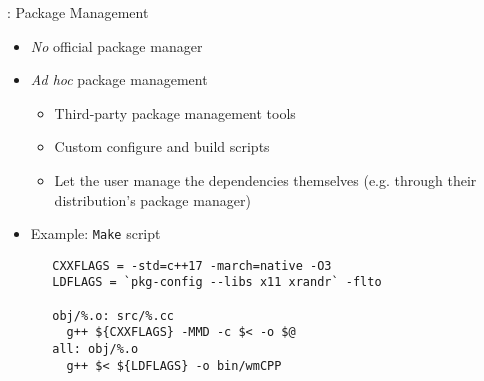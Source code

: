 \begin{frame}[fragile]{\underline{\cpp}: Package Management \hfill {\footnotesize \currentname}}

    \begin{itemize}

        \item \textit{No} official package manager\\

        \item \textit{Ad hoc} package management\\
            \begin{itemize}
                \item Third-party package management tools
                \item Custom configure and build scripts
                \item Let the user manage the dependencies themselves (e.g. through
                their distribution's package manager)
            \end{itemize}

        \item Example: \texttt{Make} script\\
\begin{verbatim}
   CXXFLAGS = -std=c++17 -march=native -O3
   LDFLAGS = `pkg-config --libs x11 xrandr` -flto

   obj/%.o: src/%.cc
     g++ ${CXXFLAGS} -MMD -c $< -o $@
   all: obj/%.o
     g++ $< ${LDFLAGS} -o bin/wmCPP
\end{verbatim}

    \end{itemize}

\end{frame}

